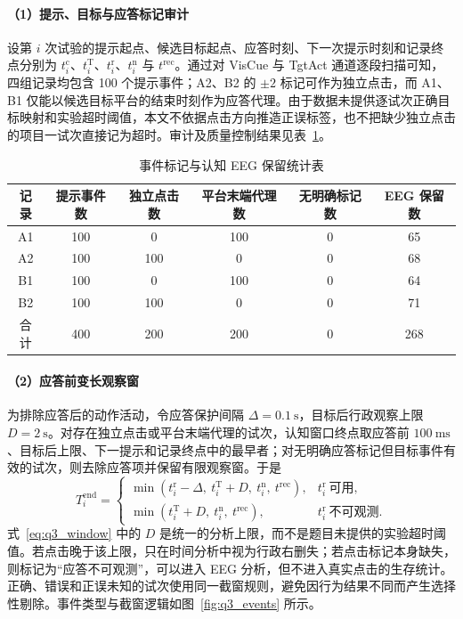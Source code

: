 \documentclass[a4paper]{ctexart}
\numberwithin{figure}{section}       %
\begin{document}
\paragraph{（1）提示、目标与应答标记审计}

设第 $i$ 次试验的提示起点、候选目标起点、应答时刻、下一次提示时刻和记录终点分别为 $t_i^{\mathrm c}$、$t_i^{\mathrm T}$、$t_i^{\mathrm r}$、$t_i^{\mathrm n}$ 与 $t^{\mathrm{rec}}$。通过对 VisCue 与 TgtAct 通道逐段扫描可知，四组记录均包含 100 个提示事件；A2、B2 的 $\pm2$ 标记可作为独立点击，而 A1、B1 仅能以候选目标平台的结束时刻作为应答代理。由于数据未提供逐试次正确目标映射和实验超时阈值，本文不依据点击方向推造正误标签，也不把缺少独立点击的项目一试次直接记为超时。审计及质量控制结果见表~\ref{tab:q3_event_audit}。

\begin{table}[H]
\centering
\caption{事件标记与认知 EEG 保留统计表}
\label{tab:q3_event_audit}
\begin{tabular}{cccccc}
\toprule
\textbf{记录} & \textbf{提示事件数} & \textbf{独立点击数} & \textbf{平台末端代理数} & \textbf{无明确标记数} & \textbf{EEG 保留数} \\
\midrule
A1 & 100 & 0   & 100 & 0 & 65 \\
A2 & 100 & 100 & 0   & 0 & 68 \\
B1 & 100 & 0   & 100 & 0 & 64 \\
B2 & 100 & 100 & 0   & 0 & 71 \\
\midrule
合计 & 400 & 200 & 200 & 0 & 268 \\
\bottomrule
\end{tabular}
\end{table}

\paragraph{（2）应答前变长观察窗}

为排除应答后的动作活动，令应答保护间隔 $\Delta=0.1~\mathrm{s}$，目标后行政观察上限 $D=2~\mathrm{s}$。对存在独立点击或平台末端代理的试次，认知窗口终点取应答前 $100~\mathrm{ms}$、目标后上限、下一提示和记录终点中的最早者；对无明确应答标记但目标事件有效的试次，则去除应答项并保留有限观察窗。于是
\begin{equation}
T_i^{\mathrm{end}}=
\begin{cases}
\min\!\left(t_i^{\mathrm r}-\Delta,\ t_i^{\mathrm T}+D,\ t_i^{\mathrm n},\ t^{\mathrm{rec}}\right),
& t_i^{\mathrm r}\ \text{可用},\\[2mm]
\min\!\left(t_i^{\mathrm T}+D,\ t_i^{\mathrm n},\ t^{\mathrm{rec}}\right),
& t_i^{\mathrm r}\ \text{不可观测}.
\end{cases}
\tag{3-1}
\label{eq:q3_window}
\end{equation}
式~\eqref{eq:q3_window} 中的 $D$ 是统一的分析上限，而不是题目未提供的实验超时阈值。若点击晚于该上限，只在时间分析中视为行政右删失；若点击标记本身缺失，则标记为“应答不可观测”，可以进入 EEG 分析，但不进入真实点击的生存统计。正确、错误和正误未知的试次使用同一截窗规则，避免因行为结果不同而产生选择性剔除。事件类型与截窗逻辑如图~\ref{fig:q3_events} 所示。
\end{document}
